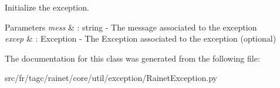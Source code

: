 Initialize the exception. 


\begin{DoxyParams}{Parameters}
{\em mess} & \-: string -\/ The message associated to the exception \\
\hline
{\em excep} & \-: Exception -\/ The Exception associated to the exception (optional) \\
\hline
\end{DoxyParams}


The documentation for this class was generated from the following file\-:\begin{DoxyCompactItemize}
\item 
src/fr/tagc/rainet/core/util/exception/Rainet\-Exception.\-py\end{DoxyCompactItemize}
